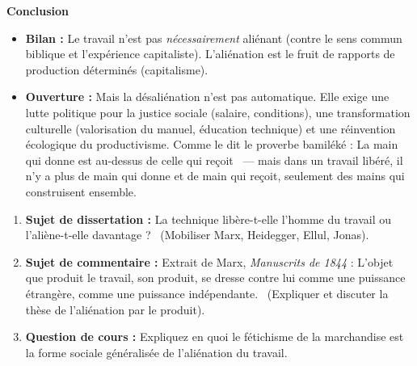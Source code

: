 \documentclass[11pt]{article}
\begin{document}
\begin{exoresolu}
\textbf{Conclusion}
\begin{itemize}
    \item \textbf{Bilan :} Le travail n'est pas \emph{nécessairement} aliénant (contre le sens commun biblique et l'expérience capitaliste). L'aliénation est le fruit de rapports de production déterminés (capitalisme).
    \item \textbf{Ouverture :} Mais la désaliénation n'est pas automatique. Elle exige une lutte politique pour la justice sociale (salaire, conditions), une transformation culturelle (valorisation du manuel, éducation technique) et une réinvention écologique du productivisme. Comme le dit le proverbe bamiléké : \guillemotleft La main qui donne est au-dessus de celle qui reçoit \guillemotright\ — mais dans un travail libéré, il n'y a plus de main qui donne et de main qui reçoit, seulement des mains qui construisent ensemble.
\end{itemize}
\end{exoresolu}

\begin{exercice}
\begin{enumerate}
    \item \textbf{Sujet de dissertation :} \guillemotleft La technique libère-t-elle l'homme du travail ou l'aliène-t-elle davantage ? \guillemotright\ (Mobiliser Marx, Heidegger, Ellul, Jonas).
    \item \textbf{Sujet de commentaire :} Extrait de Marx, \emph{Manuscrits de 1844} : \guillemotleft L'objet que produit le travail, son produit, se dresse contre lui comme une puissance étrangère, comme une puissance indépendante. \guillemotright\ (Expliquer et discuter la thèse de l'aliénation par le produit).
    \item \textbf{Question de cours :} Expliquez en quoi le fétichisme de la marchandise est la forme sociale généralisée de l'aliénation du travail.
\end{enumerate}
\end{exercice}
\end{document}
